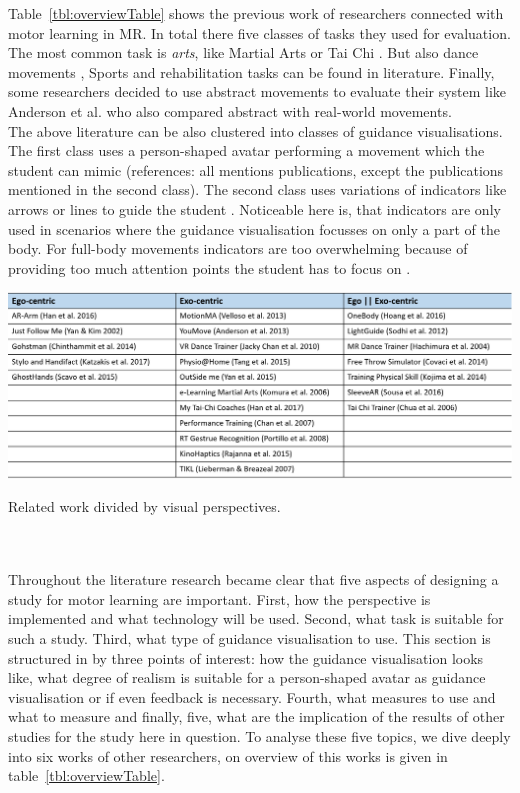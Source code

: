 Table~\ref{tbl:overviewTable} shows the previous work of researchers connected with motor learning in MR. In total there five classes of tasks they used for evaluation. The most common task is \textit{arts}, like Martial Arts or Tai Chi \cite{Han2016, Yang2002, Katzakis2017, Han2017, Portillo2008, Hoang2016, Chua2003, Komura2006}. But also dance movements \cite{Anderson2013a, Yan2015, Chan2010, Chan2007, Hachimura2004}, Sports \cite{Covaci2014, Kojima2014} and rehabilitation tasks \cite{Velloso2013, Chinthammit2014, Tang2015, Rajanna2015, Sousa2016} can be found in literature. Finally, some researchers decided to use abstract movements \cite{Sodhi2012, Lieberman2007} to evaluate their system like Anderson et al. \cite{Anderson2013a} who also compared abstract with real-world movements.\\
The above literature can be also clustered into classes of guidance visualisations. The first class uses a person-shaped avatar performing a movement which the student can mimic (references: all mentions publications, except the publications mentioned in the second class). The second class uses variations of indicators like arrows or lines to guide the student \cite{Katzakis2017, Tang2015, Sodhi2012, Covaci2014, Sousa2016}. Noticeable here is, that indicators are only used in scenarios where the guidance visualisation focusses on only a part of the body. For full-body movements indicators are too overwhelming because of providing too much attention points the student has to focus on \cite{Sodhi2012}.
\begin{table}
	\centering
	\includegraphics[width=1.0\textwidth]{img/overview_table.png}
	\caption{Related work divided by visual perspectives.}
	\label{tbl:overviewTable}
\end{table}\\ $ $\\
Throughout the literature research became clear that five aspects of designing a study for motor learning are important. First, how the perspective is implemented and what technology will be used. Second, what task is suitable for such a study. Third, what type of guidance visualisation to use. This section is structured in by three points of interest: how the guidance visualisation looks like, what degree of realism is suitable for a person-shaped avatar as guidance visualisation or if even feedback is necessary. Fourth, what measures to use and what to measure and finally, five, what are the implication of the results of other studies for the study here in question. To analyse these five topics, we dive deeply into six works of other researchers, on overview of this works is given in table~\ref{tbl:overviewTable}.
